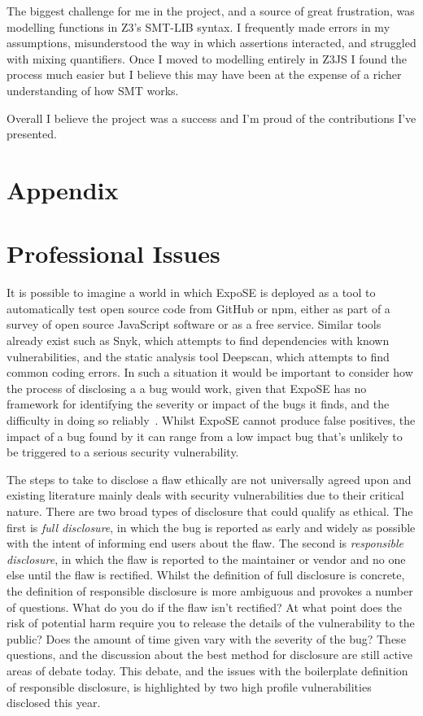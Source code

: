 \documentclass[]{final_report}
\begin{document}
The biggest challenge for me in the project, and a source of great frustration, was modelling functions in Z3's SMT-LIB syntax. I frequently made errors in my assumptions, misunderstood the way in which assertions interacted, and struggled with mixing quantifiers. Once I moved to modelling entirely in Z3JS I found the process much easier but I believe this may have been at the expense of a richer understanding of how SMT works.

Overall I believe the project was a success and I'm proud of the contributions I've presented.

\newpage


\label{endpage}

\newpage

\section*{Appendix}

\section{Professional Issues}
It is possible to imagine a world in which ExpoSE is deployed as a tool to automatically test open source code from GitHub or npm, either as part of a survey of open source JavaScript software or as a free service. Similar tools already exist such as Snyk, which attempts to find dependencies with known vulnerabilities, and the static analysis tool Deepscan, which attempts to find common coding errors. In such a situation it would be important to consider how the process of disclosing a a bug would work, given that ExpoSE has no framework for identifying the severity or impact of the bugs it finds, and the difficulty in doing so reliably~\cite{lamkanfi2010predicting}. Whilst ExpoSE cannot produce false positives, the impact of a bug found by it can range from a low impact bug that's unlikely to be triggered to a serious security vulnerability. 

The steps to take to disclose a flaw ethically are not universally agreed upon and existing literature mainly deals with security vulnerabilities due to their critical nature. There are two broad types of disclosure that could qualify as ethical. The first is \textit{full disclosure}, in which the bug is reported as early and widely as possible with the intent of informing end users about the flaw. The second is \textit{responsible disclosure}, in which the flaw is reported to the maintainer or vendor and no one else until the flaw is rectified. Whilst the definition of full disclosure is concrete, the definition of responsible disclosure is more ambiguous and provokes a number of questions. What do you do if the flaw isn't rectified? At what point does the risk of potential harm require you to release the details of the vulnerability to the public? Does the amount of time given vary with the severity of the bug? These questions, and the discussion about the best method for disclosure are still active areas of debate today. This debate, and the issues with the boilerplate definition of responsible disclosure, is highlighted by two high profile vulnerabilities disclosed this year. 
\end{document}
